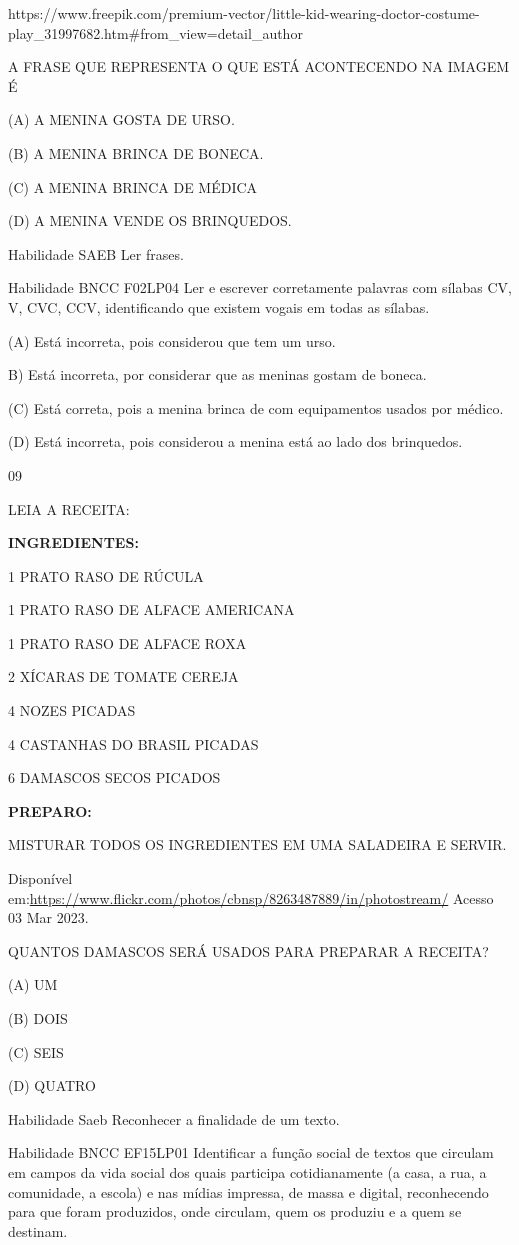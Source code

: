 {{{{{{https://www.freepik.com/premium-vector/little-kid-wearing-doctor-costume-play\_31997682.htm\#from\_view=detail\_author

A FRASE QUE REPRESENTA O QUE ESTÁ ACONTECENDO NA IMAGEM É

(A) A MENINA GOSTA DE URSO.

(B) A MENINA BRINCA DE BONECA.

(C) A MENINA BRINCA DE MÉDICA

(D) A MENINA VENDE OS BRINQUEDOS.

Habilidade SAEB Ler frases.

Habilidade BNCC F02LP04 Ler e escrever corretamente palavras com sílabas
CV, V, CVC, CCV, identificando que existem vogais em todas as sílabas.

(A) Está incorreta, pois considerou que tem um urso.

B) Está incorreta, por considerar que as meninas gostam de boneca.

(C) Está correta, pois a menina brinca de com equipamentos usados por
médico.

(D) Está incorreta, pois considerou a menina está ao lado dos
brinquedos.

\num{09}

LEIA A RECEITA:

\textbf{INGREDIENTES:}

1 PRATO RASO DE RÚCULA

1 PRATO RASO DE ALFACE AMERICANA

1 PRATO RASO DE ALFACE ROXA

2 XÍCARAS DE TOMATE CEREJA

4 NOZES PICADAS

4 CASTANHAS DO BRASIL PICADAS

6 DAMASCOS SECOS PICADOS

\textbf{PREPARO:}

MISTURAR TODOS OS INGREDIENTES EM UMA SALADEIRA E SERVIR.

Disponível
em:\url{https://www.flickr.com/photos/cbnsp/8263487889/in/photostream/}
Acesso 03 Mar 2023.

QUANTOS DAMASCOS SERÁ USADOS PARA PREPARAR A RECEITA?

(A) UM

(B) DOIS

(C) SEIS

(D) QUATRO

Habilidade Saeb Reconhecer a finalidade de um texto.

Habilidade BNCC EF15LP01 Identificar a função social de textos que
circulam em campos da vida social dos quais participa cotidianamente (a
casa, a rua, a comunidade, a escola) e nas mídias impressa, de massa e
digital, reconhecendo para que foram produzidos, onde circulam, quem os
produziu e a quem se destinam.

}}}}}}
